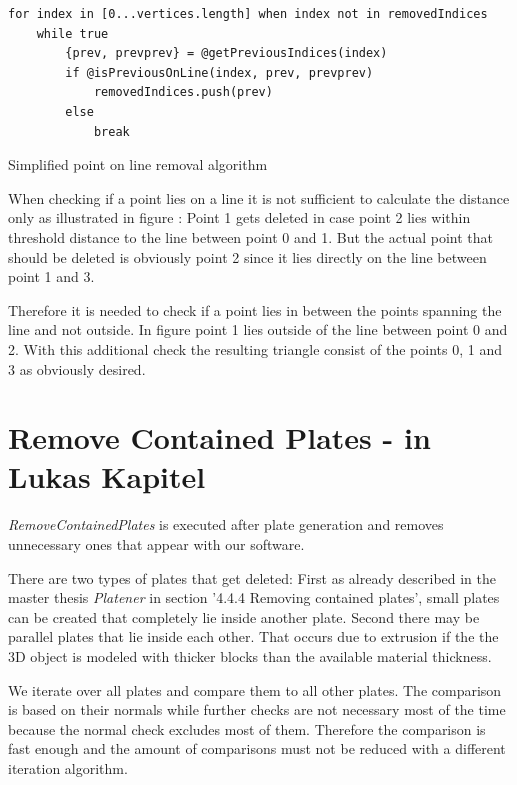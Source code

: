 \documentclass[../ClassicThesis.tex]{subfiles}
\begin{document}
\begin{listing}[!h]
\centering
\begin{verbatim}
for index in [0...vertices.length] when index not in removedIndices
    while true
        {prev, prevprev} = @getPreviousIndices(index)
        if @isPreviousOnLine(index, prev, prevprev)
            removedIndices.push(prev)
        else
            break
\end{verbatim}
\caption{Simplified point on line removal algorithm}
\label{lst:pointOnLineRemovalAlgo}
\end{listing}


When checking if a point lies on a line it is not sufficient to calculate the distance only as illustrated in figure : Point 1 gets deleted in case point 2 lies within threshold distance to the line between point 0 and 1. But the actual point that should be deleted is obviously point 2 since it lies directly on the line between point 1 and 3. 

Therefore it is needed to check if a point lies in between the points spanning the line and not outside. In figure  point 1 lies outside of the line between point 0 and 2. With this additional check the resulting triangle consist of the points 0, 1 and 3 as obviously desired.










\section{Remove Contained Plates - in Lukas Kapitel}

\emph{RemoveContainedPlates} is executed after plate generation and removes unnecessary ones that appear with our software. 

There are two types of plates that get deleted: First as already described in the master thesis \emph{Platener} \cite{master-thesis} in section '4.4.4 Removing contained plates', small plates can be created that completely lie inside another plate. Second there may be parallel plates that lie inside each other. That occurs due to extrusion if the the 3D object is modeled with thicker blocks than the available material thickness.

We iterate over all plates and compare them to all other plates. The comparison is based on their normals while further checks are not necessary most of the time because the normal check excludes most of them. Therefore the comparison is fast enough and the amount of comparisons must not be reduced with a different iteration algorithm.
\end{document}
